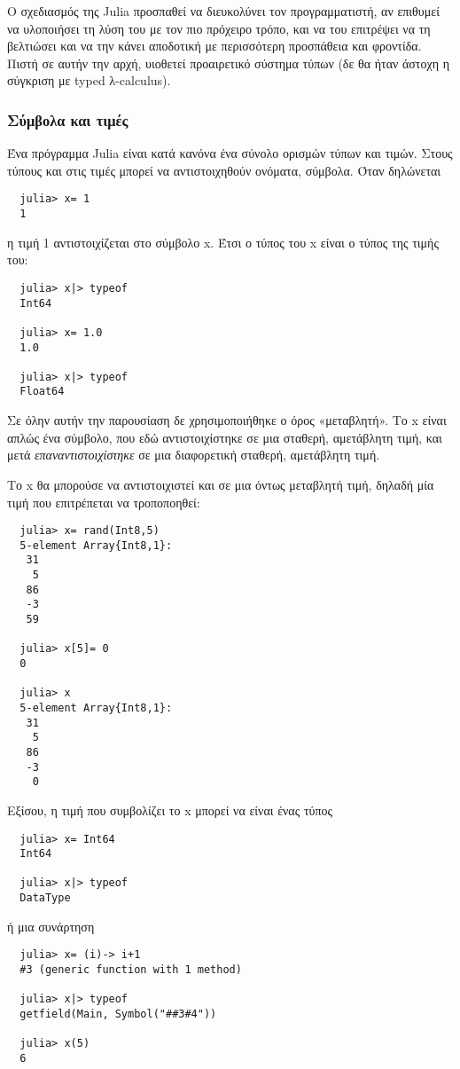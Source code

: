   Ο σχεδιασμός της Julia προσπαθεί να διευκολύνει τον προγραμματιστή, αν επιθυμεί να υλοποιήσει τη λύση του με τον πιο πρόχειρο τρόπο,
  και να του επιτρέψει να τη βελτιώσει και να την κάνει αποδοτική με περισσότερη προσπάθεια και φροντίδα.
  Πιστή σε αυτήν την αρχή, υιοθετεί προαιρετικό σύστημα τύπων (δε θα ήταν άστοχη η σύγκριση με typed λ-calculus).

  \subsubsection{Σύμβολα και τιμές}

  Ένα πρόγραμμα Julia είναι κατά κανόνα ένα σύνολο ορισμών τύπων και τιμών. Στους τύπους και στις τιμές μπορεί να αντιστοιχηθούν ονόματα, σύμβολα. Όταν δηλώνεται
  \begin{verbatim}
  julia> x= 1
  1
  \end{verbatim}
  η τιμή 1 αντιστοιχίζεται στο σύμβολο x.
  Έτσι ο τύπος του x είναι ο τύπος της τιμής του:
  \begin{verbatim}
  julia> x|> typeof
  Int64

  julia> x= 1.0
  1.0

  julia> x|> typeof
  Float64
  \end{verbatim}
  Σε όλην αυτήν την παρουσίαση δε χρησιμοποιήθηκε ο όρος «μεταβλητή». Το x είναι απλώς ένα σύμβολο, που εδώ αντιστοιχίστηκε σε μια σταθερή, αμετάβλητη τιμή,
  και μετά \textit{επαναντιστοιχίστηκε} σε μια διαφορετική σταθερή, αμετάβλητη τιμή.

  Το x θα μπορούσε να αντιστοιχιστεί και σε μια όντως μεταβλητή τιμή, δηλαδή μία τιμή που επιτρέπεται να τροποποηθεί:
  \begin{verbatim}
  julia> x= rand(Int8,5)
  5-element Array{Int8,1}:
   31
    5
   86
   -3
   59

  julia> x[5]= 0
  0

  julia> x
  5-element Array{Int8,1}:
   31
    5
   86
   -3
    0
  \end{verbatim}

  Εξίσου, η τιμή που συμβολίζει το x μπορεί να είναι ένας τύπος
  \begin{verbatim}
  julia> x= Int64
  Int64

  julia> x|> typeof
  DataType
  \end{verbatim}
  ή μια συνάρτηση
  \begin{verbatim}
  julia> x= (i)-> i+1
  #3 (generic function with 1 method)

  julia> x|> typeof
  getfield(Main, Symbol("##3#4"))

  julia> x(5)
  6
  \end{verbatim}

